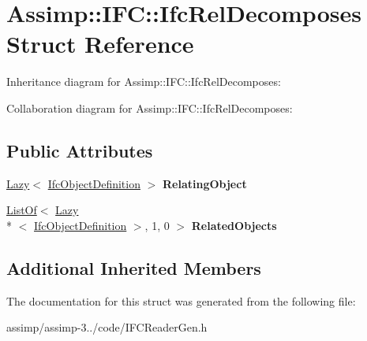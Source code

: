 \hypertarget{struct_assimp_1_1_i_f_c_1_1_ifc_rel_decomposes}{\section{Assimp\+:\+:I\+F\+C\+:\+:Ifc\+Rel\+Decomposes Struct Reference}
\label{struct_assimp_1_1_i_f_c_1_1_ifc_rel_decomposes}
}


Inheritance diagram for Assimp\+:\+:I\+F\+C\+:\+:Ifc\+Rel\+Decomposes\+:


Collaboration diagram for Assimp\+:\+:I\+F\+C\+:\+:Ifc\+Rel\+Decomposes\+:
\subsection*{Public Attributes}
\begin{DoxyCompactItemize}
\item 
\hypertarget{struct_assimp_1_1_i_f_c_1_1_ifc_rel_decomposes_a379e479125b8015eca42af86e94fe2a6}{\hyperlink{struct_assimp_1_1_s_t_e_p_1_1_lazy}{Lazy}$<$ \hyperlink{struct_assimp_1_1_i_f_c_1_1_ifc_object_definition}{Ifc\+Object\+Definition} $>$ {\bfseries Relating\+Object}}\label{struct_assimp_1_1_i_f_c_1_1_ifc_rel_decomposes_a379e479125b8015eca42af86e94fe2a6}

\item 
\hypertarget{struct_assimp_1_1_i_f_c_1_1_ifc_rel_decomposes_a588a7811aa4b1e0b977c5768fc5903ad}{\hyperlink{struct_assimp_1_1_s_t_e_p_1_1_list_of}{List\+Of}$<$ \hyperlink{struct_assimp_1_1_s_t_e_p_1_1_lazy}{Lazy}\\*
$<$ \hyperlink{struct_assimp_1_1_i_f_c_1_1_ifc_object_definition}{Ifc\+Object\+Definition} $>$, 1, 0 $>$ {\bfseries Related\+Objects}}\label{struct_assimp_1_1_i_f_c_1_1_ifc_rel_decomposes_a588a7811aa4b1e0b977c5768fc5903ad}

\end{DoxyCompactItemize}
\subsection*{Additional Inherited Members}


The documentation for this struct was generated from the following file\+:\begin{DoxyCompactItemize}
\item 
assimp/assimp-\/3../code/I\+F\+C\+Reader\+Gen.\+h\end{DoxyCompactItemize}
